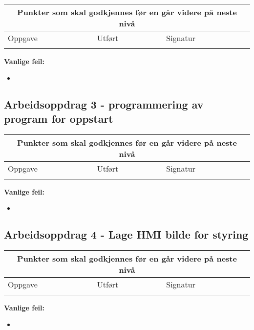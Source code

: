 \begin{center}
\begin{tabular}{ | m{8cm} | m{1cm}| m{2cm} | } 
\hline
\multicolumn{3}{|c|}{Punkter som skal godkjennes før en går videre på neste nivå} \\
	\hline
	Oppgave	& Utført & Signatur \\ 
	\hline
& & \\ 
	\hline
\end{tabular}
\end{center}
\textbf{Vanlige feil:}
\begin{itemize}[noitemsep]
	\item 
\end{itemize}
\newpage
\subsection*{Arbeidsoppdrag 3 - programmering av program for oppstart}

\begin{center}
\begin{tabular}{ | m{8cm} | m{1cm}| m{2cm} | } 
\hline
\multicolumn{3}{|c|}{Punkter som skal godkjennes før en går videre på neste nivå} \\
	\hline
	Oppgave	& Utført & Signatur \\ 
	\hline
& & \\ 
	\hline
\end{tabular}
\end{center}
\textbf{Vanlige feil:}
\begin{itemize}[noitemsep]
	\item 
\end{itemize}
\newpage

\subsection*{Arbeidsoppdrag 4 - Lage HMI bilde for styring}
\begin{center}
\begin{tabular}{ | m{8cm} | m{1cm}| m{2cm} | } 
\hline
\multicolumn{3}{|c|}{Punkter som skal godkjennes før en går videre på neste nivå} \\
	\hline
	Oppgave	& Utført & Signatur \\ 
	\hline
& & \\ 
	\hline
\end{tabular}
\end{center}
\textbf{Vanlige feil:}
\begin{itemize}[noitemsep]
	\item 
\end{itemize}
\newpage




\noindent
{}


